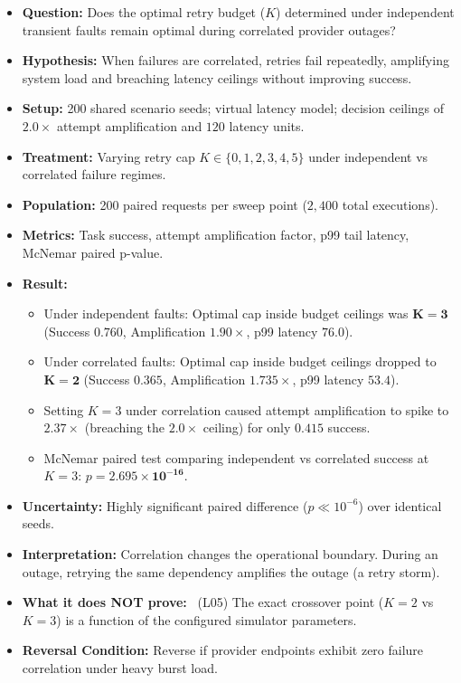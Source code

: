 \begingroup
\small
\begin{itemize}\setlength{\itemsep}{1.2pt}\setlength{\parsep}{0pt}\setlength{\parskip}{0pt}
    \item \textbf{Question:} Does the optimal retry budget ($K$) determined under independent transient faults remain optimal during correlated provider outages?
    \item \textbf{Hypothesis:} When failures are correlated, retries fail repeatedly, amplifying system load and breaching latency ceilings without improving success.
    \item \textbf{Setup:} 200 shared scenario seeds; virtual latency model; decision ceilings of $2.0\times$ attempt amplification and $120$ latency units.
    \item \textbf{Treatment:} Varying retry cap $K \in \{0, 1, 2, 3, 4, 5\}$ under independent vs correlated failure regimes.
    \item \textbf{Population:} 200 paired requests per sweep point ($2,400$ total executions).
    \item \textbf{Metrics:} Task success, attempt amplification factor, p99 tail latency, McNemar paired p-value.
    \item \textbf{Result:} \MEASURED
    \begin{itemize}\setlength{\itemsep}{0.8pt}\setlength{\parsep}{0pt}
        \item Under independent faults: Optimal cap inside budget ceilings was $\mathbf{K=3}$ (Success $\mathbf{0.760}$, Amplification $\mathbf{1.90\times}$, p99 latency $\mathbf{76.0}$).
        \item Under correlated faults: Optimal cap inside budget ceilings dropped to $\mathbf{K=2}$ (Success $\mathbf{0.365}$, Amplification $\mathbf{1.735\times}$, p99 latency $\mathbf{53.4}$).
        \item Setting $K=3$ under correlation caused attempt amplification to spike to $\mathbf{2.37\times}$ (breaching the $2.0\times$ ceiling) for only $\mathbf{0.415}$ success.
        \item McNemar paired test comparing independent vs correlated success at $K=3$: $p = \mathbf{2.695 \times 10^{-16}}$.
    \end{itemize}
    \item \textbf{Uncertainty:} Highly significant paired difference ($p \ll 10^{-6}$) over identical seeds.
    \item \textbf{Interpretation:} Correlation changes the operational boundary. During an outage, retrying the same dependency amplifies the outage (a retry storm).
    \item \textbf{What it does NOT prove:} \LIMITATION\ (L05) The exact crossover point ($K=2$ vs $K=3$) is a function of the configured simulator parameters.
    \item \textbf{Reversal Condition:} Reverse if provider endpoints exhibit zero failure correlation under heavy burst load.
\end{itemize}
\endgroup

